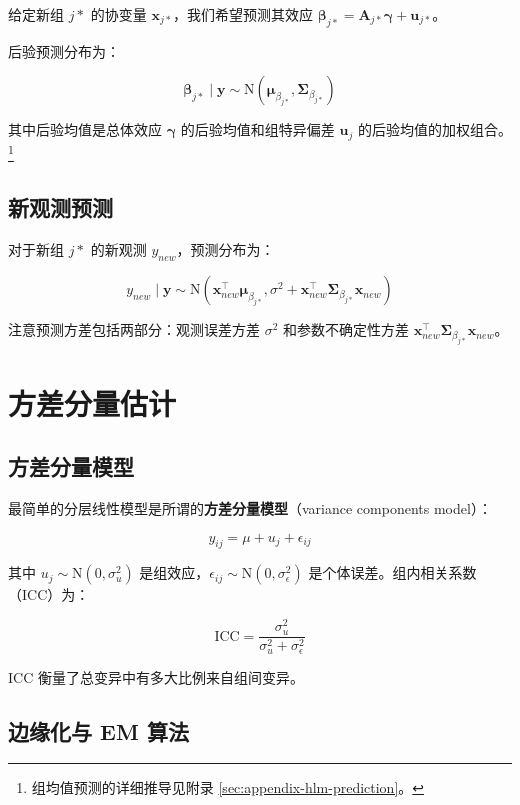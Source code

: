 给定新组 $j*$ 的协变量 $\mathbf{x}_{j*}$，我们希望预测其效应 $\boldsymbol{\beta}_{j*} = \mathbf{A}_{j*}\boldsymbol{\gamma} + \mathbf{u}_{j*}$。

后验预测分布为：

\[
\boldsymbol{\beta}_{j*} \mid \mathbf{y} \sim \mathrm{N}(\boldsymbol{\mu}_{\beta_{j*}}, \boldsymbol{\Sigma}_{\beta_{j*}})
\]

其中后验均值是总体效应 $\boldsymbol{\gamma}$ 的后验均值和组特异偏差 $\mathbf{u}_j$ 的后验均值的加权组合。\footnote{组均值预测的详细推导见附录 \cref{sec:appendix-hlm-prediction}。}

\subsection{新观测预测}
\label{sec:new-observation-prediction}

对于新组 $j*$ 的新观测 $y_{new}$，预测分布为：

\[
y_{new} \mid \mathbf{y} \sim \mathrm{N}(\mathbf{x}_{new}^\top \boldsymbol{\mu}_{\beta_{j*}}, \sigma^2 + \mathbf{x}_{new}^\top \boldsymbol{\Sigma}_{\beta_{j*}} \mathbf{x}_{new})
\]

注意预测方差包括两部分：观测误差方差 $\sigma^2$ 和参数不确定性方差 $\mathbf{x}_{new}^\top \boldsymbol{\Sigma}_{\beta_{j*}} \mathbf{x}_{new}$。

\section{方差分量估计}
\label{sec:variance-components}

\subsection{方差分量模型}
\label{sec:variance-component-model}

最简单的分层线性模型是所谓的\textbf{方差分量模型}（variance components model）：

\[
y_{ij} = \mu + u_j + \epsilon_{ij}
\]

其中 $u_j \sim \mathrm{N}(0, \sigma_u^2)$ 是组效应，$\epsilon_{ij} \sim \mathrm{N}(0, \sigma_\epsilon^2)$ 是个体误差。组内相关系数（ICC）为：

\[
\mathrm{ICC} = \frac{\sigma_u^2}{\sigma_u^2 + \sigma_\epsilon^2}
\]

ICC 衡量了总变异中有多大比例来自组间变异。

\subsection{边缘化与 EM 算法}
\label{sec:marginalization-em}

